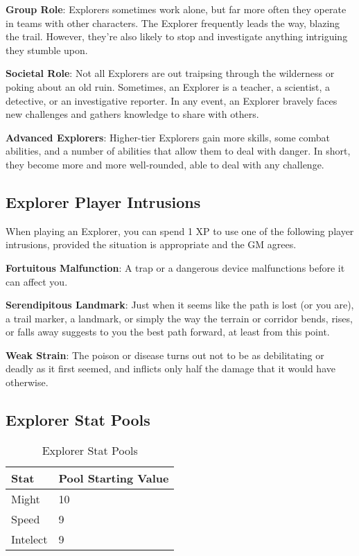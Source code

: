 \textbf{Group Role}: Explorers sometimes work alone, but far more often they operate in teams with other characters. The Explorer frequently leads the way, blazing the trail. However, they’re also likely to stop and investigate anything intriguing they stumble upon. 

\textbf{Societal Role}: Not all Explorers are out traipsing through the wilderness or poking about an old ruin. Sometimes, an Explorer is a teacher, a scientist, a detective, or an investigative reporter. In any event, an Explorer bravely faces new challenges and gathers knowledge to share with others.

\textbf{Advanced Explorers}: Higher-tier Explorers gain more skills, some combat abilities, and a number of abilities that allow them to deal with danger. In short, they become more and more well-rounded, able to deal with any challenge.

\subsection{Explorer Player Intrusions}
When playing an Explorer, you can spend 1 XP to use one of the following player intrusions, provided the situation is appropriate and the GM agrees.

\textbf{Fortuitous Malfunction}: A trap or a dangerous device malfunctions before it can affect you.

\textbf{Serendipitous Landmark}: Just when it seems like the path is lost (or you are), a trail marker, a landmark, or simply the way the terrain or corridor bends, rises, or falls away suggests to you the best path forward, at least from this point.

\textbf{Weak Strain}: The poison or disease turns out not to be as debilitating or deadly as it first seemed, and inflicts only half the damage that it would have otherwise.

\subsection{Explorer Stat Pools}

\begin{table}[H]
\centering
\caption{Explorer Stat Pools}
\label{tab: Explorer Stat Pools}

\begin{tabularx}{\linewidth}{| X | X |}
\hline
\textbf{Stat} & \textbf{Pool Starting Value} \\
\hline
Might & 10 \\ \hline
Speed & 9 \\ \hline
Intelect & 9  \\ \hline

\end{tabularx}

\end{table}

